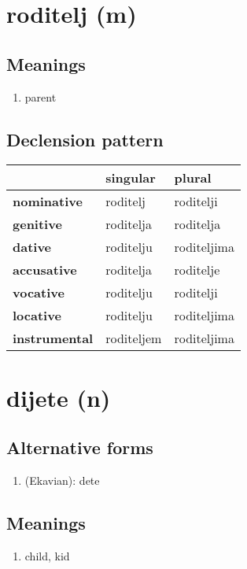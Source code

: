 \filbreak
\section{roditelj (m)}
\subsection*{Meanings}
\begin{enumerate}
\item parent
\end{enumerate}
\subsection*{Declension pattern}
\begin{tabularx}{\linewidth}{Xll}
\toprule
{} &    singular &       plural \\
\midrule
\textbf{nominative  } &    roditelj &    roditelji \\
\textbf{genitive    } &   roditelja &    roditelja \\
\textbf{dative      } &   roditelju &  roditeljima \\
\textbf{accusative  } &   roditelja &    roditelje \\
\textbf{vocative    } &   roditelju &    roditelji \\
\textbf{locative    } &   roditelju &  roditeljima \\
\textbf{instrumental} &  roditeljem &  roditeljima \\
\bottomrule
\end{tabularx}

\filbreak
\section{dijete (n)}
\subsection*{Alternative forms}
\begin{enumerate}
\item (Ekavian): dete
\end{enumerate}
\subsection*{Meanings}
\begin{enumerate}
\item child, kid
\end{enumerate}
